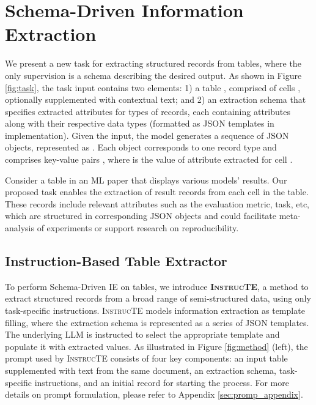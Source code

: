 \documentclass[11pt]{article}
\newcommand\method{\textsc{InstrucTE}}
\begin{document}
\section{Schema-Driven Information Extraction}
\label{sec:task_def}

We present a new task for extracting structured records from tables, where the only supervision is a schema describing the desired output.
As shown in Figure \ref{fig:task}, the task input contains two elements: 1) a table , comprised of  cells , optionally supplemented with contextual text;  and 2) an extraction schema  that specifies extracted attributes for  types of records, each containing  attributes  along with their respective data types (formatted as JSON templates in implementation). 
Given the input, the model generates a sequence of  JSON objects, represented as . Each object  corresponds to one record type and comprises  key-value pairs , where  is the value of attribute  extracted for cell . 


Consider a table in an ML paper that displays various models' results.
Our proposed task enables the extraction of result records from each cell in the table.  These records include relevant attributes such as the evaluation metric, task, etc, which are structured in corresponding JSON objects and could facilitate meta-analysis of experiments or support research on reproducibility.







\subsection{Instruction-Based Table Extractor}
\label{sec:task}








To perform Schema-Driven IE on tables, we introduce \textbf{\method{}}, a method to extract structured records from a broad range of semi-structured data, using only task-specific instructions.
\method{} models information extraction as template filling, where the extraction schema is represented as a series of JSON templates. The underlying LLM is instructed to select the appropriate template and populate it with extracted values. As illustrated in Figure \ref{fig:method} (left), the prompt used by \method{} consists of four key components: an input table supplemented with text from the same document, an extraction schema, task-specific instructions, and an initial record for starting the process. For more details on prompt formulation, please refer to Appendix \ref{sec:promp_appendix}. 
\end{document}
